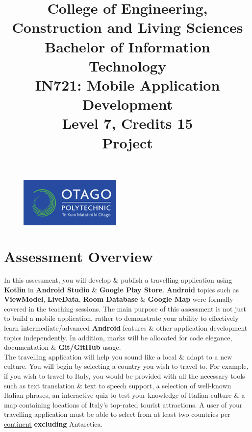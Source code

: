 \documentclass{article}
\author{}
\begin{document}
\begin{figure}
	\centering
	\includegraphics[width=50mm]{../../resources/img/logo.png}
\end{figure}

\title{College of Engineering, Construction and Living Sciences\\Bachelor of Information Technology\\IN721: Mobile Application Development\\Level 7, Credits 15\\\textbf{Project}}
\date{}
\maketitle

\section*{Assessment Overview}
In this assessment, you will develop \& publish a travelling application using \textbf{Kotlin} in \textbf{Android Studio} \& \textbf{Google Play Store}. \textbf{Android} topics such as \textbf{ViewModel}, \textbf{LiveData}, \textbf{Room Database} \& \textbf{Google Map} were formally covered in the teaching sessions. The main purpose of this assessment is not just to build a mobile application, rather to demonstrate your ability to effectively learn intermediate/advanced \textbf{Android} features \& other application development topics independently. In addition, marks will be allocated for code elegance, documentation \& \textbf{Git/GitHub} usage. \\

The travelling application will help you sound like a local \& adapt to a new culture. You will begin by selecting a country you wish to travel to. For example, if you wish to travel to Italy, you would be provided with all the necessary tools such as text translation \& text to speech support, a selection of well-known Italian phrases, an interactive quiz to test your knowledge of Italian culture \& a map containing locations of Italy's top-rated tourist attractions. A user of your travelling application must be able to select from at least two countries per \href{https://www.worldometers.info/geography/7-continents/}{continent} \textbf{excluding} Antarctica. 
\end{document}
